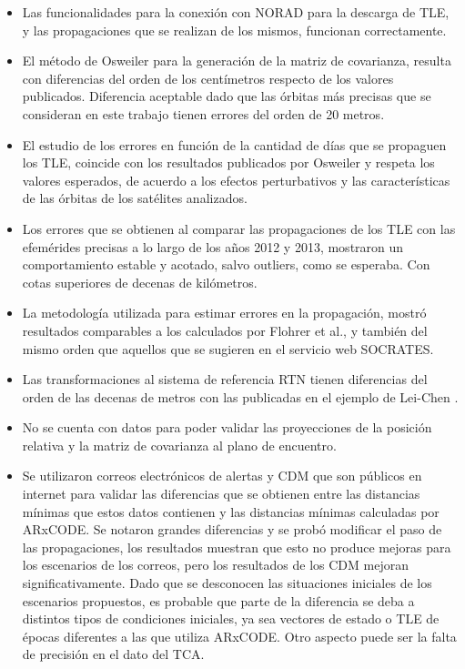  \begin{itemize}
  \item Las funcionalidades para la conexi\'on con NORAD para la descarga de TLE, y las propagaciones que se realizan de los mismos, funcionan correctamente.\\
  \item El m\'etodo de Osweiler \citep{osweiler} para la generaci\'on de la matriz de covarianza, resulta con diferencias del orden de los cent\'imetros respecto de los valores publicados. Diferencia  aceptable dado que las \'orbitas m\'as precisas que se consideran en este trabajo tienen errores del orden de 20 metros.\\
  \item El estudio de los errores en funci\'on de la cantidad de d\'ias que se propaguen los TLE, coincide con los resultados publicados por Osweiler \citep{osweiler} y respeta los valores esperados, de acuerdo a los efectos perturbativos y las caracter\'isticas de las \'orbitas de los sat\'elites analizados.\\
  \item Los errores que se obtienen al comparar las propagaciones de los TLE con las efem\'erides precisas a lo largo de los a\~nos 2012 y 2013, mostraron un comportamiento estable y acotado, salvo outliers, como se esperaba. Con cotas superiores de decenas de kil\'ometros.\\
  \item La metodolog\'ia utilizada para estimar errores en la propagaci\'on, mostr\'o resultados comparables a los calculados por Flohrer et al., \citep{flohrer2008assessment} y tambi\'en del mismo orden que aquellos que se sugieren en el servicio web SOCRATES.
  \item Las transformaciones al sistema de referencia RTN tienen diferencias del orden de las decenas de metros con las publicadas en el ejemplo de Lei-Chen \citep{leichen}.\\
  \item No se cuenta con datos para poder validar las proyecciones de la posici\'on relativa y la matriz de covarianza al plano de encuentro.\\
  \item Se utilizaron correos electr\'onicos de alertas y CDM que son p\'ublicos en internet para validar las diferencias que se obtienen entre las distancias m\'inimas que estos datos contienen y las distancias m\'inimas calculadas por ARxCODE. Se notaron grandes diferencias y se prob\'o modificar el paso de las propagaciones, los resultados muestran que esto no produce mejoras para los escenarios de los correos, pero los resultados de los CDM mejoran significativamente. Dado que se desconocen las situaciones iniciales de los escenarios propuestos, es probable que parte de la diferencia se deba a distintos tipos de condiciones iniciales, ya sea vectores de estado o TLE de \'epocas  diferentes a las que utiliza ARxCODE. Otro aspecto puede ser la falta de precisi\'on en el dato del TCA.\\

\end{itemize}
